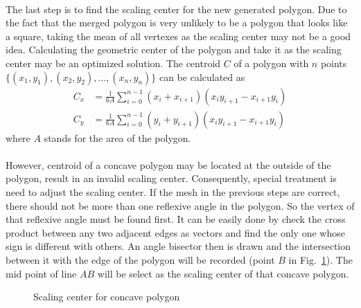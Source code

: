 \paragraph{}
The last step is to find the scaling center for the new generated polygon.
Due to the fact that the merged polygon is very unlikely to be a polygon that looks like a square, taking the mean of all vertexes as the scaling center may not be a good idea.
Calculating the geometric center of the polygon and take it as the scaling center may be an optimized solution.
The centroid $C$ of a polygon with $n$ points $\{(x_1,y_1),(x_2,y_2),\dots,(x_n,y_n)\}$ can be calculated as
\begin{equation}
    \begin{aligned}
        C_x &= \frac{1}{6A} \sum_{i=0}^{n-1}\left(
            x_i + x_{i+1}    
        \right) \left(
            x_i y_{i+1} - x_{i+1} y_i
        \right) \\
        C_y &= \frac{1}{6A} \sum_{i=0}^{n-1}\left(
            y_i + y_{i+1}    
        \right) \left(
            x_i y_{i+1} - x_{i+1} y_i
        \right)
    \end{aligned}
\end{equation}
where $A$ stands for the area of the polygon.

\paragraph{}
However, centroid of a concave polygon may be located at the outside of the polygon, result in an invalid scaling center.
Consequently, special treatment is need to adjust the scaling center.
If the mesh in the previous steps are correct, there should not be more than one reflexive angle in the polygon.
So the vertex of that reflexive angle must be found first.
It can be easily done by check the cross product between any two adjacent edges as vectors and find the only one whose sign is different with others.
An angle bisector then is drawn and the intersection between it with the edge of the polygon will be recorded (point $B$ in Fig.~\ref{adap_fig:mt_concave_sc}).
The mid point of line $AB$ will be select as the scaling center of that concave polygon.

\begin{figure}[!ht]
    \centering
    \caption[Scaling center for concave polygon]{Scaling center for concave polygon}
    \label{adap_fig:mt_concave_sc}
\end{figure}

